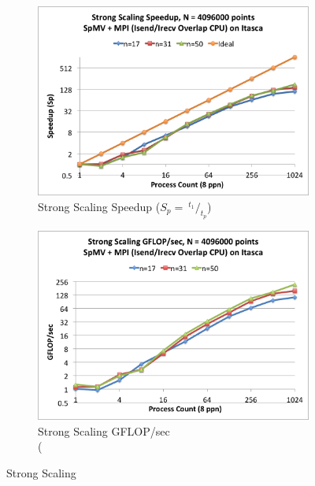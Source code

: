 \documentclass{report}
\begin{document}
\begin{figure}
\centering
\begin{subfigure}[t]{0.48\textwidth}
\centering
\includegraphics[width=\textwidth]{performance_content/scaling/strong_scaling_speedup_4M_overlap_cpu_SpMV_and_comm_all_stencils.png}
\caption{Strong Scaling Speedup ($S_p = \ ^{t_{1}}/_{t_p}$)}
\label{fig:compare_strong_scaling_speedup_all_stencils}
\end{subfigure}
\quad
\begin{subfigure}[t]{0.48\textwidth}
\centering
\includegraphics[width=\textwidth]{performance_content/scaling/strong_scaling_gflops_4M_overlap_cpu_SpMV_and_comm_all_stencils.png}
\caption{Strong Scaling GFLOP/sec \\ (    }
\label{fig:compare_strong_scaling_gflops_all_stencils}
\end{subfigure}
\caption{Strong Scaling}
\end{figure} 
\end{document}
